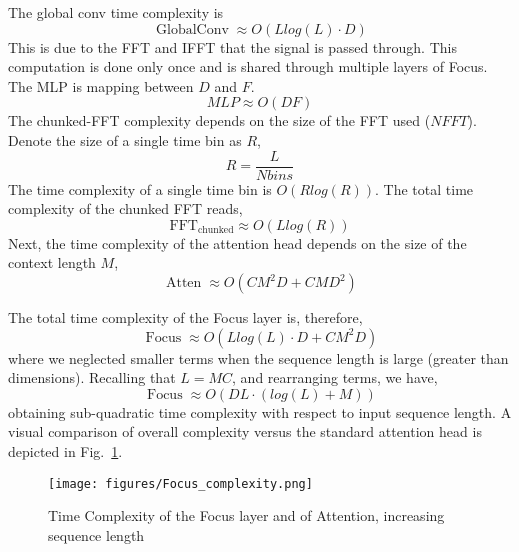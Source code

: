 \documentclass[11pt]{article}
\begin{document}
{}
The global conv time complexity is \begin{equation}
    \operatorname{GlobalConv} \approx O(Llog(L)\cdot D)
\end{equation} 
This is due to the FFT and IFFT that the signal is passed through.
This computation is done only once and is shared through multiple layers of Focus. The MLP is mapping between $D$ and $F$.
\begin{equation}
    MLP \approx O(DF)
\end{equation}
The chunked-FFT complexity depends on the size of the FFT used ($NFFT$). Denote the size of a single time bin as $R$,
\begin{equation}
    R = \frac{L}{Nbins}
\end{equation}
The time complexity of a single time bin is $O(Rlog(R))$.
The total time complexity of the chunked FFT reads,
\begin{equation}
    \operatorname{FFT_{chunked}} \approx O(Llog(R))
\end{equation}
Next, the time complexity of the attention head depends on the size of the context length $M$,
\begin{equation}
    \operatorname{Atten} \approx O(CM^2D + CMD^2)
\end{equation}

The total time complexity of the Focus layer is, therefore, 
\begin{equation}
    \operatorname{Focus} \approx O(Llog(L)\cdot D + CM^2D)
\end{equation}
where we neglected smaller terms when the sequence length is large (greater than dimensions). Recalling that $L=MC$, and rearranging terms, we have,
\begin{equation}
    \operatorname{Focus} \approx O(DL\cdot (log(L)+M))
\end{equation}
obtaining sub-quadratic time complexity with respect to input sequence length.
A visual comparison of overall complexity versus the standard attention head is depicted in Fig.~\ref{fig:time_complexity}.
\begin{figure}
    \centering
    \texttt{[image: figures/Focus\_complexity.png]}
\caption{Time Complexity of the Focus layer and of Attention, increasing sequence length}
    \label{fig:time_complexity}
\end{figure}
\end{document}
